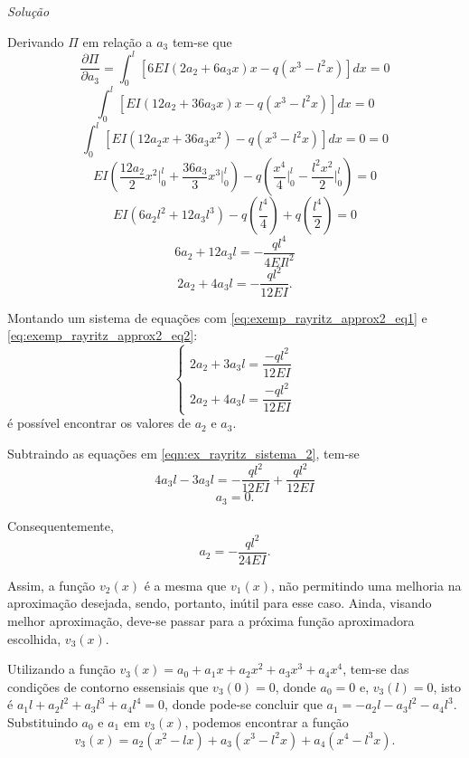 \documentclass[
	12pt,				%
	openright,			%
    twoside,			%
	a4paper,			%
	english,			%
	french,				%
	spanish,			%
	brazil				%
	]{abntex2}
\makeatletter
\renewenvironment{proof}[1][\proofname]{
	\par\pushQED{\qed}%
	\normalfont \topsep6\p@\@plus6\p@\relax
	\trivlist
	\item\relax
		{\itshape
			#1\@addpunct{.}}\hspace\labelsep\ignorespaces
}{%
	\popQED\endtrivlist\@endpefalse
}
\newenvironment{solution}{
	\begin{proof}[Solução]
}{%
	\end{proof}
}
\numberwithin{lema}{chapter}
\numberwithin{teorema}{chapter}
\numberwithin{definicao}{chapter}
\numberwithin{exemplo}{chapter}
\numberwithin{figure}{chapter}
\makeatother
\begin{document}
\begin{solution}
	Derivando $\Pi$ em relação a $a_3$ tem-se que
	$$
		\frac{\partial \Pi}{\partial a_3}
		=
		\int_0^l \left [
			6EI(2a_2 + 6a_3x)x
			-
			q(x^3 - l^2x)
		\right ] dx
		= 0
	$$
	$$
		\int_0^l \left [
			EI(12a_2 + 36a_3x)x
			-
			q(x^3 - l^2x)
		\right ] dx
		= 0
	$$
	$$
		\int_0^l \left [
			EI(12a_2 x + 36a_3x^2)
			-
			q(x^3 - l^2x)
		\right ] dx = 0
		= 0
	$$
	$$
		EI \left (
			\frac{12a_2}{2}x^2 \Big |_0^l
			+
			\frac{36a_3}{3}x^3 \Big |_0^l
		\right )
		-
		q \left (
			\frac{x^4}{4} \Big |_0^l
			-
			\frac{l^2x^2}{2} \Big |_0^l
		\right )
		= 0
	$$
	$$
		EI(6a_2l^2 + 12a_3l^3)
		-
		q \left (
			\frac{l^4}{4}
		\right )
		+
		q \left (
			\frac{l^4}{2}
		\right )
		=0
	$$
	$$
		6a_2 + 12a_3l = -\frac{ql^4}{4EIl^2}
	$$
	\begin{equation}
		\label{eq:exemp_rayritz_approx2_eq2}
		2a_2 + 4a_3l = -\frac{ql^2}{12EI}
		\text{.}
	\end{equation}
	
	Montando um sistema de equações com \eqref{eq:exemp_rayritz_approx2_eq1} e \eqref{eq:exemp_rayritz_approx2_eq2}:
	\begin{equation}
		\label{eqn:ex_rayritz_sistema_2}
		\begin{cases}
			2a_2+3a_3l=\dfrac{-ql^2}{12EI}\\[10pt]
			2a_2+4a_3l=\dfrac{-ql^2}{12EI}
		\end{cases}
	\end{equation}
	é possível encontrar os valores de $a_2$ e $a_3$. 
	
	Subtraindo as equações em \eqref{eqn:ex_rayritz_sistema_2}, tem-se
	$$
		4a_3l-3a_3l=-\frac{ql^2}{12EI}+\frac{ql^2}{12EI}
	$$
	$$
		a_3=0\text{.}
	$$
	
	Consequentemente,
	$$
		a_2=-\frac{ql^2}{24EI}
		\text{.}
	$$

	Assim, a função $v_2(x)$ é a mesma que $v_1(x)$, não permitindo uma melhoria na aproximação desejada, sendo, portanto, inútil para esse caso. Ainda, visando melhor aproximação, deve-se passar para a próxima função aproximadora escolhida, $v_3(x)$.
	
	Utilizando a função $v_3(x)=a_0+a_1x+a_2x^2+a_3x^3+a_4x^4$, tem-se das condições de contorno essensiais que $v_3(0)=0$, donde $a_0=0$ e, $v_3(l)=0$, isto é $a_1l+a_2l^2+a_3l^3+a_4l^4=0$, donde pode-se concluir que $a_1=-a_2l-a_3l^2-a_4l^3$. Substituindo $a_0$ e $a_1$ em $v_3(x)$, podemos encontrar a função
	\begin{equation}
		\label{eqn:cap_metodo_ray_ritz:func_def_v3}
		v_3(x)=
		a_2 (x^2 - lx)
		+
		a_3 (x^3 - l^2x)
		+
		a_4 (x^4 - l^3x)
		\text{.}
	\end{equation}
	

\end{solution}
\end{document}
